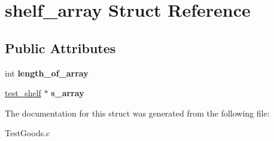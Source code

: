 \hypertarget{structshelf__array}{}\section{shelf\+\_\+array Struct Reference}
\label{structshelf__array}
\subsection*{Public Attributes}
\begin{DoxyCompactItemize}
\item 
\hypertarget{structshelf__array_a4d7bbe10b5328d9caec31bbba07e6d42}{}int {\bfseries length\+\_\+of\+\_\+array}\label{structshelf__array_a4d7bbe10b5328d9caec31bbba07e6d42}

\item 
\hypertarget{structshelf__array_a8b76c65209c873cbe4b7f14e6919c582}{}\hyperlink{structtest__shelf}{test\+\_\+shelf} $\ast$ {\bfseries s\+\_\+array}\label{structshelf__array_a8b76c65209c873cbe4b7f14e6919c582}

\end{DoxyCompactItemize}


The documentation for this struct was generated from the following file\+:\begin{DoxyCompactItemize}
\item 
Test\+Goods.\+c\end{DoxyCompactItemize}
